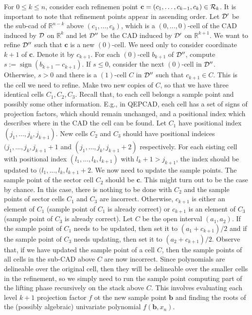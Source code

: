 \documentclass[
]{book}
\theoremstyle{definition}
\theoremstyle{definition}
\theoremstyle{definition}
\theoremstyle{definition}
\theoremstyle{remark}
\begin{document}
For \(0 \le k \le n\), consider each refinemen point \(\mathbf{c} = (c_1,\ldots,c_{k-1}, c_k) \in {\cal R}_k\). It is important to note that refinement points appear in ascending order.
Let \({\cal D}'\) be the sub-cad of \(\mathbb{R}^{n-k}\) above \((c_1,\ldots,c_k)\), which is a \((0,\ldots,0)\)-cell of the CAD induced by \(\cal D\) on \(\mathbb{R}^k\) and let \({\cal D}''\) be the CAD induced by \({\cal D}'\) on \(\mathbb{R}^{k+1}\). We want to refine \({\cal D}''\) such that \(\mathbf{c}\) is a new \((0)\)-cell.
We need only to consider coordinate \(k+1\) of \(\mathbf{c}\). Denote it by \(c_{k+1}\).
For each \((0)\)-cell \(b_{k+1}\) of \({\cal D}''\), compute \(s := \operatorname{sign}(b_{k+1} - c_{k+1})\). If \(s \le 0\), consider the next \((0)\)-cell in \({\cal D}''\). Otherwise, \(s > 0\) and there is a \((1)\)-cell \(C\) in \({\cal D}''\) such that \(c_{k+1} \in C\). This is the cell we need to refine.
Make two new copies of \(C\), so that we have three identical cells \(C_1,C_2,C_3\). Recall that, to each cell belongs a sample point and possibly some other information. E.g., in QEPCAD, each cell has a set of signs of projection factors, which should remain unchanged, and a positional index which describes where in the CAD the cell can be found. Let \(C_1\) have positional index \((j_1,\ldots,j_k,j_{k+1})\). New cells \(C_2\) and \(C_3\) should have positional indeices \((j_1,\ldots,j_k,j_{k+1} + 1\) and \((j_1,\ldots,j_k,j_{k+1}+2)\) respectively. For each eisting cell with positional index \((l_1,\ldots,l_k,l_{k+1})\) with \(l_k+1 > j_{k+1}\), the index should be updated to \((l_1,\ldots,l_k,l_{k+1} + 2\). We now need to update the sample points. The sample point of the sector cell \(C_2\) should be \(\mathbf{c}\). This might turn out to be the case by chance. In this case, there is nothing to be done with \(C_2\) and the sample points of sector cells \(C_1\) and \(C_3\) are incorrect. Otherwise, \(c_{k+1}\) is either an element of \(C_1\) (sample point of \(C_1\) is already correct) or \(c_{k+1}\) is an element of \(C_3\) (sample point of \(C_3\) is already correct). Let \(C\) be the open interval \((a_1,a_2)\). If the sample point of \(C_1\) needs to be updated, then set it to \((a_1 + c_{k+1}) / 2\) and if the sample point of \(C_3\) needs updating, then set it to \((a_2 + c_{k+1}) / 2\). Observe that, if we have updated the sample point of a cell \(C\), then the sample points of all cells in the sub-CAD above \(C\) are now incorrect. Since polynomials are delineable over the original cell, then they will be delineable over the smaller cells in the refinement, so we simply need to run the sample point computing part of the lifting phase recursively on the stack above \(C\). This involves evaluating each level \(k+1\) projection factor \(f\) ot the new sample point \(\mathbf{b}\) and finding the roots of the (possibly algebraic) univariate polynomial \(f(\mathbf{b},x_n)\).
\end{document}
